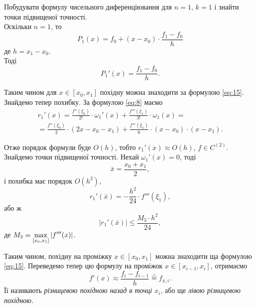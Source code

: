\begin{example}
	Побудувати формулу чисельного диференціювання для $n = 1$, $k = 1$ і знайти точки підвищеної точності. \\

	Оскільки $n = 1$, то
	\begin{equation}
		\label{eq:14}
		P_1(x) = f_0 + (x - x_0) \cdot \frac{f_1 - f_0}{h}
	\end{equation}
	де $h = x_1 - x_0$. \\

	Тоді
	\begin{equation}
		\label{eq:15}
		P_1'(x) = \frac{f_1 - f_0}{h}.
	\end{equation}

	Таким чином для $x \in [x_0, x_1]$ похідну можна знаходити за формулою \eqref{eq:15}. \\

	Знайдемо тепер похибку. За формулою \eqref{eq:8} маємо
	\begin{multline}
		\label{eq:16}
		r_1'(x) = \frac{f''(\xi_0)}{2!} \cdot \omega_1'(x) + \frac{f'''(\xi_1)}{3!} \cdot \omega_1(x) = \\ = \frac{f''(\xi_0)}{2} \cdot (2x - x_0 - x_1) + \frac{f'''(\xi_1)}{6} \cdot (x - x_0) \cdot (x - x_1).
	\end{multline}

	Отже порядок формули буде $O(h)$, тобто $r_1'(x) \approx O(h)$, $f \in C^{(2)}$.\\

	Знайдемо точки підвищеної точності. Нехай $\omega_1'(x) = 0$, тоді
	\begin{equation}
		\label{eq:17}
		\bar x = \frac{x_0 + x_1}{2},
	\end{equation}
	і похибка має порядок $O(h^2)$, 
	\begin{equation}
		\label{eq:18}
		r_1'(\bar x) = - \frac{h^2}{24} \cdot f'''(\xi_1),
	\end{equation}
	або ж
	\begin{equation}
		\label{eq:19}
		|r_1'(\bar x)| \le \frac{M_3 \cdot h^2}{24},
	\end{equation}
	де $M_3 = \displaystyle\max\limits_{[x_0, x_1]} |f'''(x)|$.
\end{example}

Таким чином, похідну на проміжку $x \in [x_0, x_1]$ можна знаходити ща формулою \eqref{eq:15}. Переведемо тепер цю формулу на проміжок $x \in [x_{i - 1}, x_i]$, отримаємо
\begin{equation}
	\label{eq:20}
	f'(x) \approx \frac{f_i - f_{i - 1}}{h} \overset{\triangle}{=} f_{\bar x, i}.
\end{equation}
Її називають \textit{різницевою похідною назад в точці $x_i$}, або ще \textit{лівою різницевою похідною}. \\

